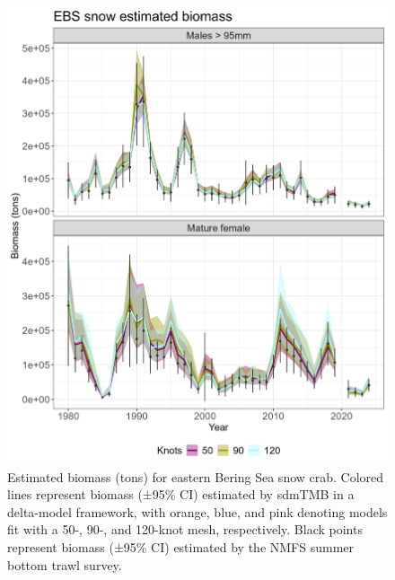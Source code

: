 \documentclass[
]{article}
\begin{document}
\begin{figure}

{\centering \includegraphics[width=1\linewidth,height=1\textheight]{../SNOW/Figures/snowEBS.biomass.index} 

}

\caption{Estimated biomass (tons) for eastern Bering Sea snow crab. Colored lines represent biomass (±95\% CI) estimated by sdmTMB in a delta-model framework, with orange, blue, and pink denoting models fit with a 50-, 90-, and 120-knot mesh, respectively. Black points represent biomass (±95\% CI) estimated by the NMFS summer bottom trawl survey.}\label{fig:snow-bio-index-EBS}
\end{figure}
\end{document}
